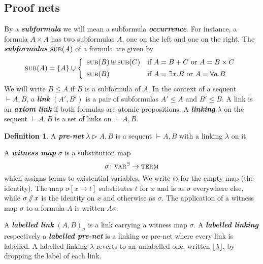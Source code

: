 \documentclass{article}
\theoremstyle{definition}
\newtheorem{definition}{Definition}
\theoremstyle{plain}
\newcommand\defn[1]{\textit{\textbf{#1}}}
\newcommand\floor[1]{\lfloor#1\rfloor}
\newcommand\varE{\textsc{var}^\exists}
\newcommand\terms{\textsc{term}}
\newcommand\subs[1]{\textsc{sub}(#1)}
\newcommand\+{+}
\renewcommand\*{\times}
\newcommand\sub{\leq}
\newcommand\seq[3][]{{\vdash_{#1}}#2,#3}
\newcommand\net[3]{#1\triangleright #2,#3}
\newcommand\clink[3][\sigma]{(#2,#3)_{#1}}
\newcommand\minus{\mathop{/\mathchoice{\kern-3pt}{\kern-3pt}{\kern-2.5pt}{\kern-2pt}/}}
\begin{document}

\subsection{Proof nets}

By a \defn{subformula} we will mean a subformula \defn{occurrence}. For instance, a formula $A\*A$ has two subformulas $A$, one on the left and one on the right. The \defn{subformulas} $\subs A$ of a formula are given by
\[
	\subs A = \{A\} \cup
	\left\{\begin{array}{ll}
		\subs B\uplus\subs C	& \text{if $A=B\+C$ or $A=B\*C$} \\[5pt]
		\subs B					& \text{if $A=\exists x.B$ or $A=\forall a.B$}
	\end{array}\right.
\]
We will write $B\sub A$ if $B$ is a subformula of $A$. In the context of a sequent $\seq AB$, a \defn{link} $(A',B')$ is a pair of subformulas $A'\leq A$ and $B'\leq B$. A link is an \defn{axiom link} if both formulas are atomic propositions. A \defn{linking} $\lambda$ on the sequent $\seq AB$ is a set of links on $\seq AB$. %

\begin{definition}
A \defn{pre-net} $\net\lambda AB$ is a sequent $\seq AB$ with a linking $\lambda$ on it.
\end{definition}

A \defn{witness map} $\sigma$ is a substitution map
\[
	\sigma\colon \varE \to \terms
\]
which assigns terms to existential variables. We write $\varnothing$ for the empty map (the identity). The map $\sigma[x\mapsto t]$ substitutes $t$ for $x$ and is as $\sigma$ everywhere else, while $\sigma\minus x$ is the identity on $x$ and otherwise as $\sigma$. The application of a witness map $\sigma$ to a formula $A$ is written $A\sigma$. 

A \defn{labelled link} $\clink AB$ is a link carrying a witness map $\sigma$. A \defn{labelled linking} respectively a \defn{labelled pre-net} is a linking or pre-net where every link is labelled. A labelled linking $\lambda$ reverts to an unlabelled one, written $\floor\lambda$, by dropping the label of each link. 
\end{document}
